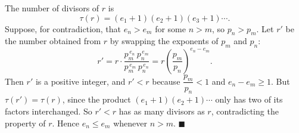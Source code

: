 The number of divisors of $r$ is
\[\tau(r)=(e_1+1)(e_2+1)(e_3+1)\cdots.\]
Suppose, for contradiction, that $e_n>e_m$ for some $n>m$, so $p_n>p_m$. Let $r'$ be the number obtained from $r$ by swapping the exponents of $p_m$ and $p_n$:
\[r'=r\cdot\dfrac{p_m^{\,e_n}\,p_n^{\,e_m}}{p_m^{\,e_m}\,p_n^{\,e_n}}=r\left(\dfrac{p_m}{p_n}\right)^{e_n-e_m}.\]
Then $r'$ is a positive integer, and $r'<r$ because $\dfrac{p_m}{p_n}<1$ and $e_n-e_m\ge1$. But $\tau(r')=\tau(r)$, since the product $(e_1+1)(e_2+1)\cdots$ only has two of its factors interchanged. So $r'<r$ has as many divisors as $r$, contradicting the property of $r$. Hence $e_n\le e_m$ whenever $n>m$. $\blacksquare$
